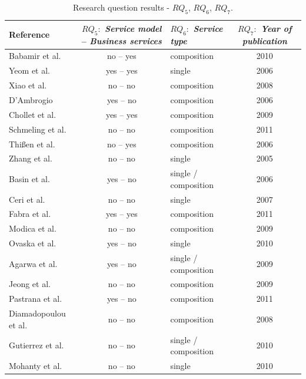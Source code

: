 \begin{table}[ht!]
\centering
\scriptsize
\begin{tabular}{l|c|l|c}
  \hline 
  \hline
   \textbf{Reference} & $RQ_5:$ \textbf{\textit{Service model}} --
   \textbf{\textit{Business services}} & $RQ_6:$ \textbf{\textit{Service type}} 
   &   $RQ_7:$ \textbf{\textit{Year of publication}} 
   \\
  \hline
  \hline  
  Babamir et al. \cite{Babamir2010} & no -- yes  & composition & 2010   
 \\  
  \hline   
  Yeom et al. \cite{Yeom2006} & yes -- yes & single   & 2006  \\  \hline
  Xiao et al. \cite{XiaoCZBOLH08} & no -- no & composition    & 2008
   \\ 
  \hline 
  D'Ambrogio \cite{DAmbrogio06} & yes  -- no & composition  & 2006 \\
   \hline
  Chollet et al. \cite{CholletL09} & yes -- yes & composition  &  2009 \\
  \hline 
  Schmeling et al. \cite{SchmelingCM11} & no -- no & composition &  2011 \\ 
  \hline
   Thi{\ss}en et al. \cite{ThissenW06} & no -- yes & composition & 2006
   \\
  \hline
  Zhang et al. \cite{ZhangPSP05} & no -- no  & single  & 2005 \\ 
  \hline
  Basin et al. \cite{BasinDL06} & yes -- no & single / composition  & 
  2006\\
  \hline 
  Ceri et al. \cite{CeriDMF07} & no -- no  & single  &  2007\\ 
  \hline 
  Fabra et al. \cite{Fabra2011} & yes -- yes & composition  &  2011\\
  \hline
  Modica et al. \cite{ModicaTV09} & no -- no & composition & 2009\\ 
  \hline
  Ovaska et al. \cite{OvaskaEHPA10} & yes -- no & single & 2010\\
  \hline
  Agarwa et al. \cite{AgarwalLS09} & yes -- no & single / composition  &  
  2009\\
  \hline
  Jeong et al. \cite{JeongCL09} & no -- no  & composition &  2009\\
  \hline
  Pastrana et al. \cite{PastranaPK11} & yes -- no & composition &  2011 \\
  \hline
  Diamadopoulou et al. \cite{DiamadopoulouMPS08} & no -- no & composition 
  & 2008\\
  \hline
  Gutierrez et al. \cite{GutierrezRF10} & no -- no &  single / composition 
  & 2010\\
  \hline
  Mohanty et al. \cite{MohantyRP10} & no -- no  & single  & 2010\\
  \hline
  \hline  
\end{tabular}
\caption{Research question results - $RQ_5$, $RQ_6$, $RQ_7$.}
\label{tab:result03}
\end{table} 

